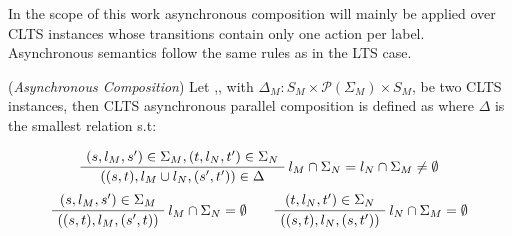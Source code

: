 In the scope of this work asynchronous composition will mainly be applied over CLTS instances whose transitions contain only one action per label. Asynchronous semantics follow the same rules as in the LTS case.


\begin{definition} 
	\label{def:asynchronous_composition}(\emph{Asynchronous Composition}) Let ,, with $\Delta_M : S_M \times \mathcal{P}(\Sigma_M) \times S_M$, be two CLTS instances, then CLTS asynchronous parallel composition is defined as  where $\Delta$ is the smallest relation s.t:
	\begin{center}
		\begin{equation}
		\AxiomC{$(s, l_M, s') \in \Sigma_M,(t, l_N, t') \in \Sigma_N  $}\RightLabel{$l_M \cap \Sigma_N = l_N \cap \Sigma_M \neq \emptyset$}
		\UnaryInfC{$((s,t),l_M \cup l_N,(s',t')) \in \Delta$}
		\DisplayProof
		\end{equation}	
		\begin{equation}
		\AxiomC{$(s, l_M, s') \in \Sigma_M $}\RightLabel{$l_M \cap \Sigma_N = \emptyset$}
		\UnaryInfC{$((s,t),l_M,(s',t))$}
		\DisplayProof
		\quad\quad
		\AxiomC{$(t, l_N, t') \in \Sigma_N $}\RightLabel{$l_N \cap \Sigma_M = \emptyset$}
		\UnaryInfC{$((s,t),l_N,(s,t'))$}
		\DisplayProof
		\end{equation}
	\end{center}
\end{definition}
